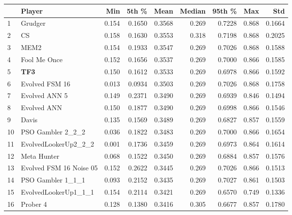 \begin{tabular}{llrrrrrrr}
\toprule
{} &                   Player &    Min &   5th \% &    Mean &  Median &  95th \% &    Max &     Std \\
\midrule
1  &                  Grudger &  0.154 &  0.1650 &  0.3568 &   0.269 &  0.7228 &  0.868 &  0.1664 \\
2  &                       CS &  0.158 &  0.1630 &  0.3553 &   0.318 &  0.7198 &  0.868 &  0.2025 \\
3  &                     MEM2 &  0.154 &  0.1933 &  0.3547 &   0.269 &  0.7026 &  0.868 &  0.1588 \\
4  &             Fool Me Once &  0.152 &  0.1656 &  0.3537 &   0.269 &  0.7000 &  0.866 &  0.1585 \\
5  &                      \textbf{TF3} &  0.150 &  0.1612 &  0.3533 &   0.269 &  0.6978 &  0.866 &  0.1592 \\
6  &           Evolved FSM 16 &  0.013 &  0.0934 &  0.3503 &   0.269 &  0.7026 &  0.868 &  0.1758 \\
7  &            Evolved ANN 5 &  0.149 &  0.2371 &  0.3490 &   0.269 &  0.6939 &  0.846 &  0.1494 \\
8  &              Evolved ANN &  0.150 &  0.1877 &  0.3490 &   0.269 &  0.6998 &  0.866 &  0.1546 \\
9  &                    Davis &  0.135 &  0.1569 &  0.3489 &   0.269 &  0.6827 &  0.857 &  0.1559 \\
10 &        PSO Gambler 2\_2\_2 &  0.036 &  0.1822 &  0.3483 &   0.269 &  0.7000 &  0.866 &  0.1654 \\
11 &     EvolvedLookerUp2\_2\_2 &  0.001 &  0.1736 &  0.3459 &   0.269 &  0.6973 &  0.864 &  0.1614 \\
12 &              Meta Hunter &  0.068 &  0.1522 &  0.3450 &   0.269 &  0.6884 &  0.857 &  0.1576 \\
13 &  Evolved FSM 16 Noise 05 &  0.152 &  0.2622 &  0.3445 &   0.269 &  0.7026 &  0.866 &  0.1513 \\
14 &        PSO Gambler 1\_1\_1 &  0.093 &  0.2152 &  0.3435 &   0.269 &  0.7027 &  0.861 &  0.1503 \\
15 &     EvolvedLookerUp1\_1\_1 &  0.154 &  0.2114 &  0.3421 &   0.269 &  0.6570 &  0.749 &  0.1336 \\
16 &                 Prober 4 &  0.128 &  0.1380 &  0.3416 &   0.305 &  0.6677 &  0.857 &  0.1780 \\
\bottomrule
\end{tabular}
